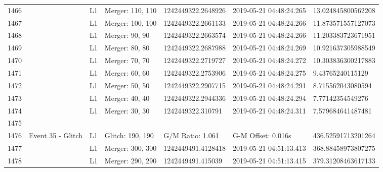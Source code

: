 \begin{longtable}{lllllll}
1466 &                                                    &       L1 &  Merger: 110, 110 &  1242449322.2648926 &  2019-05-21 04:48:24.265 &  13.024845800562208 \\
1467 &                                                    &       L1 &  Merger: 100, 100 &  1242449322.2661133 &  2019-05-21 04:48:24.266 &  11.873571557127073 \\
1468 &                                                    &       L1 &    Merger: 90, 90 &  1242449322.2663574 &  2019-05-21 04:48:24.266 &  11.203383723671951 \\
1469 &                                                    &       L1 &    Merger: 80, 80 &  1242449322.2687988 &  2019-05-21 04:48:24.269 &  10.921637305988549 \\
1470 &                                                    &       L1 &    Merger: 70, 70 &  1242449322.2719727 &  2019-05-21 04:48:24.272 &  10.303836300217883 \\
1471 &                                                    &       L1 &    Merger: 60, 60 &  1242449322.2753906 &  2019-05-21 04:48:24.275 &    9.43765240115129 \\
1472 &                                                    &       L1 &    Merger: 50, 50 &  1242449322.2907715 &  2019-05-21 04:48:24.291 &   8.715562043080594 \\
1473 &                                                    &       L1 &    Merger: 40, 40 &  1242449322.2944336 &  2019-05-21 04:48:24.294 &    7.77142354549276 \\
1474 &                                                    &       L1 &    Merger: 30, 30 &   1242449322.310791 &  2019-05-21 04:48:24.311 &   7.579684641487481 \\
1475 &                                                    &          &                   &                     &                          &                     \\
1476 &                                  Event 35 - Glitch &       L1 &  Glitch: 190, 190 &    G/M Ratio: 1.061 &       G-M Offset: 0.016s &  436.52591713201264 \\
1477 &                                                    &       L1 &  Merger: 300, 300 &  1242449491.4128418 &  2019-05-21 04:51:13.413 &  368.88458973807275 \\
1478 &                                                    &       L1 &  Merger: 290, 290 &   1242449491.415039 &  2019-05-21 04:51:13.415 &  379.31208463617133 \\

\end{longtable}
